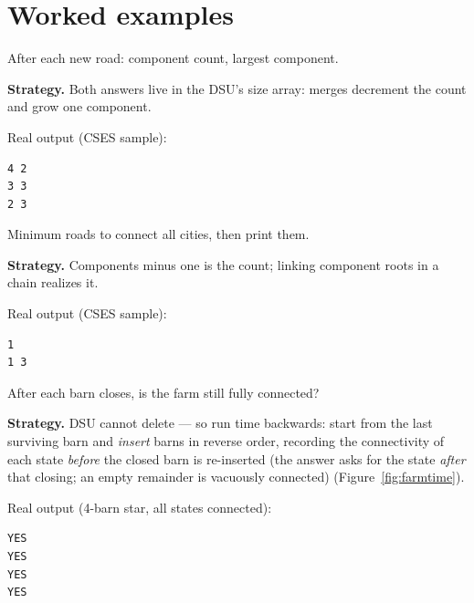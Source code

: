 \section{Worked examples}
\begin{example}\label{ex:constr}
After each new road: component count, largest component.
\par\smallskip
\textbf{Strategy.} Both answers live in the DSU's size array:
merges decrement the count and grow one component.
\par\smallskip
\begin{solution}

Real output (CSES sample):
\begin{lstlisting}[numbers=none]
4 2
3 3
2 3
\end{lstlisting}
\end{solution}
\end{example}
\begin{example}\label{ex:roads}
Minimum roads to connect all cities, then print them.
\par\smallskip
\textbf{Strategy.} Components minus one is the count; linking
component roots in a chain realizes it.
\par\smallskip
\begin{solution}

Real output (CSES sample):
\begin{lstlisting}[numbers=none]
1
1 3
\end{lstlisting}
\end{solution}
\end{example}
\begin{example}\label{ex:farm}
After each barn closes, is the farm still fully connected?
\par\smallskip
\textbf{Strategy.} DSU cannot delete --- so run time backwards:
start from the last surviving barn and \emph{insert} barns in reverse
order, recording the connectivity of each state \emph{before}
the closed barn is re-inserted (the answer asks for the state
\emph{after} that closing; an empty remainder is vacuously
connected)
(Figure~\ref{fig:farmtime}).
\par\smallskip
\begin{solution}

Real output (4-barn star, all states connected):
\begin{lstlisting}[numbers=none]
YES
YES
YES
YES
\end{lstlisting}
\end{solution}
\end{example}

